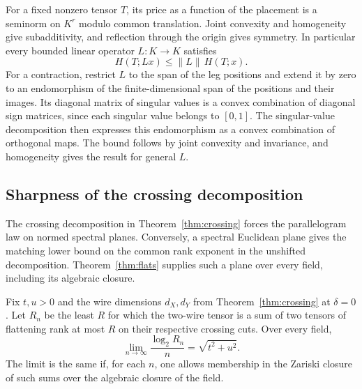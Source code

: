 For a fixed nonzero tensor $T$, its price as a function of the
placement is a seminorm on $K^r$ modulo common translation. Joint
convexity and homogeneity give subadditivity, and reflection through
the origin gives symmetry. In particular every bounded linear
operator $L\colon K\to K$ satisfies
\[
                   H(T;Lx)\le\|L\|\,H(T;x).
\]
For a contraction, restrict $L$ to the span of the leg positions and
extend it by zero to an endomorphism of the finite-dimensional span
of the positions and their images. Its diagonal matrix of singular
values is a convex combination of diagonal sign matrices, since each
singular value belongs to $[0,1]$. The singular-value decomposition
then expresses this endomorphism as a convex combination of orthogonal
maps. The bound follows by joint convexity and invariance, and
homogeneity gives the result for general $L$.

\subsection{Sharpness of the crossing decomposition}

The crossing decomposition in Theorem~\ref{thm:crossing} forces the
parallelogram law on normed spectral planes. Conversely, a spectral
Euclidean plane gives the matching lower bound on the common rank
exponent in the unshifted decomposition. Theorem~\ref{thm:flats}
supplies such a plane over every field, including its algebraic closure.

\begin{corollary}\label{cor:crossing-sharp}
Fix $t,u>0$ and the wire dimensions $d_X,d_Y$ from
Theorem~\ref{thm:crossing} at $\delta=0$. Let $R_n$ be the least $R$
for which the two-wire tensor is a sum of two tensors of flattening
rank at most $R$ on their respective crossing cuts. Over every field,
\[
                \lim_{n\to\infty}\frac{\log_2 R_n}{n}
                    =\sqrt{t^2+u^2}.
\]
The limit is the same if, for each $n$, one allows membership in the
Zariski closure of such sums over the algebraic closure of the field.
\end{corollary}

